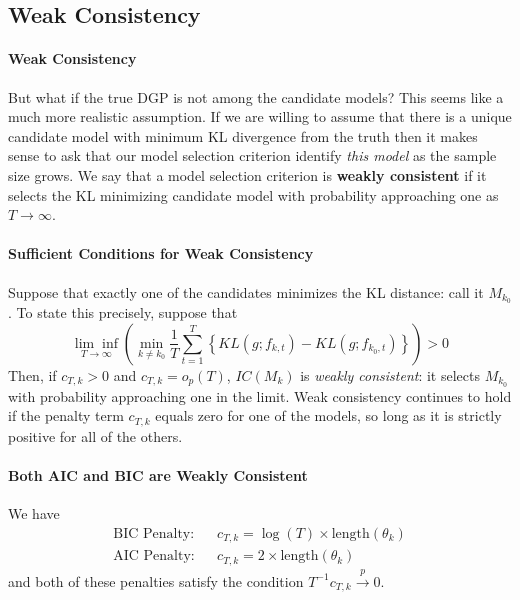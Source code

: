\documentclass[12pt]{article}
\theoremstyle{definition}
\begin{document}
\subsection{Weak Consistency}
\paragraph{Weak Consistency} But what if the true DGP is not among the candidate models? This seems like a much more realistic assumption. If we are willing to assume that there is a unique candidate model with minimum KL divergence from the truth then it makes sense to ask that our model selection criterion identify \emph{this model} as the sample size grows. We say that a model selection criterion is \textbf{weakly consistent} if it selects the KL minimizing candidate model with probability approaching one as $T\rightarrow \infty$.


\paragraph{Sufficient Conditions for Weak Consistency}
Suppose that exactly one of the candidates minimizes the KL distance: call it $M_{k_0}$. To state this precisely, suppose that
	$$\underset{T\rightarrow \infty}{\lim\inf}\left(\underset{k \neq k_0}{\min} \frac{1}{T}\sum_{t = 1}^T \left\{ KL(g; f_{k,t}) - KL(g;f_{k_0,t}) \right\} \right) > 0$$
Then, if $c_{T,k}> 0$ and $c_{T,k} = o_p(T)$, $IC(M_k)$ is \emph{weakly consistent}: it selects $M_{k_0}$ with probability approaching one in the limit. Weak consistency continues to hold if the penalty term $c_{T,k}$ equals zero for one of the models, so long as it is strictly positive for all of the others.

\paragraph{Both AIC and BIC are Weakly Consistent}
We have
	\begin{eqnarray*}
		\mbox{BIC Penalty:}&& c_{T,k} = \log(T) \times \mbox{length}(\theta_k)\\
		\mbox{AIC Penalty:} && c_{T,k} = 2\times \mbox{length}(\theta_k)
	\end{eqnarray*}
and both of these penalties satisfy the condition $T^{-1}c_{T,k} \overset{p}{\rightarrow} 0$.
\end{document}
